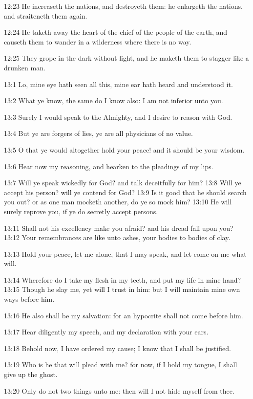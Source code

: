 12:23 He increaseth the nations, and destroyeth them: he enlargeth the nations, and straiteneth them again.

12:24 He taketh away the heart of the chief of the people of the earth, and causeth them to wander in a wilderness where there is no way.

12:25 They grope in the dark without light, and he maketh them to stagger like a drunken man.

13:1 Lo, mine eye hath seen all this, mine ear hath heard and understood it.

13:2 What ye know, the same do I know also: I am not inferior unto you.

13:3 Surely I would speak to the Almighty, and I desire to reason with God.

13:4 But ye are forgers of lies, ye are all physicians of no value.

13:5 O that ye would altogether hold your peace! and it should be your wisdom.

13:6 Hear now my reasoning, and hearken to the pleadings of my lips.

13:7 Will ye speak wickedly for God? and talk deceitfully for him?  13:8 Will ye accept his person? will ye contend for God?  13:9 Is it good that he should search you out? or as one man mocketh another, do ye so mock him?  13:10 He will surely reprove you, if ye do secretly accept persons.

13:11 Shall not his excellency make you afraid? and his dread fall upon you?  13:12 Your remembrances are like unto ashes, your bodies to bodies of clay.

13:13 Hold your peace, let me alone, that I may speak, and let come on me what will.

13:14 Wherefore do I take my flesh in my teeth, and put my life in mine hand?  13:15 Though he slay me, yet will I trust in him: but I will maintain mine own ways before him.

13:16 He also shall be my salvation: for an hypocrite shall not come before him.

13:17 Hear diligently my speech, and my declaration with your ears.

13:18 Behold now, I have ordered my cause; I know that I shall be justified.

13:19 Who is he that will plead with me? for now, if I hold my tongue, I shall give up the ghost.

13:20 Only do not two things unto me: then will I not hide myself from thee.

